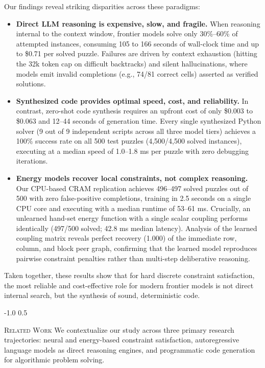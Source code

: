 \documentclass{article} %
\makeatletter
\renewcommand{\section}{\@startsection{section}{1}{\z@}%
  {-1.0\baselineskip}%
  {0.5\baselineskip}%
  {\normalfont\fontsize{12pt}{14pt}\selectfont\scshape\raggedright}}
\makeatother
\begin{document}
Our findings reveal striking disparities across these paradigms:
\begin{itemize}
    \item \textbf{Direct LLM reasoning is expensive, slow, and fragile.} When reasoning internal to the context window, frontier models solve only 30\%--60\% of attempted instances, consuming 105 to 166 seconds of wall-clock time and up to \$0.71 per solved puzzle. Failures are driven by context exhaustion (hitting the 32k token cap on difficult backtracks) and silent hallucinations, where models emit invalid completions (e.g., 74/81 correct cells) asserted as verified solutions.
    \item \textbf{Synthesized code provides optimal speed, cost, and reliability.} In contrast, zero-shot code synthesis requires an upfront cost of only \$0.003 to \$0.063 and 12--44 seconds of generation time. Every single synthesized Python solver (9 out of 9 independent scripts across all three model tiers) achieves a 100\% success rate on all 500 test puzzles (4,500/4,500 solved instances), executing at a median speed of 1.0--1.8 ms per puzzle with zero debugging iterations.
    \item \textbf{Energy models recover local constraints, not complex reasoning.} Our CPU-based CRAM replication achieves 496--497 solved puzzles out of 500 with zero false-positive completions, training in 2.5 seconds on a single CPU core and executing with a median runtime of 53--61 ms. Crucially, an unlearned hand-set energy function with a single scalar coupling performs identically (497/500 solved; 42.8 ms median latency). Analysis of the learned coupling matrix reveals perfect recovery (1.000) of the immediate row, column, and block peer graph, confirming that the learned model reproduces pairwise constraint penalties rather than multi-step deliberative reasoning.
\end{itemize}

Taken together, these results show that for hard discrete constraint satisfaction, the most reliable and cost-effective role for modern frontier models is not direct internal search, but the synthesis of sound, deterministic code.

\section{\textsc{Related Work}}
\label{sec:related_work}
We contextualize our study across three primary research trajectories: neural and energy-based constraint satisfaction, autoregressive language models as direct reasoning engines, and programmatic code generation for algorithmic problem solving.
\end{document}
